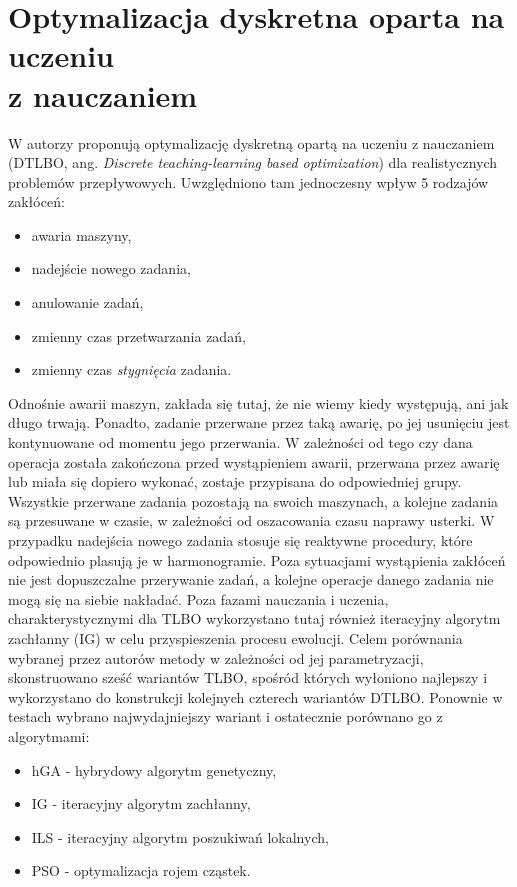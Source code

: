 \documentclass[printmode,oneside]{mgr}
\begin{document}
\section[Optymalizacja dyskretna oparta na uczeniu z nauczaniem]{Optymalizacja dyskretna oparta na uczeniu\\ z nauczaniem}
W \cite{DTLBO} autorzy proponują optymalizację dyskretną opartą na uczeniu z nauczaniem (\mbox{DTLBO}, ang. \emph{Discrete teaching-learning based optimization}) dla realistycznych problemów przepływowych. Uwzględniono tam jednoczesny wpływ 5 rodzajów zakłóceń:
\begin{itemize}
    \item awaria maszyny,
    \item nadejście nowego zadania,
    \item anulowanie zadań,
    \item zmienny czas przetwarzania zadań,
    \item zmienny czas \emph{stygnięcia} zadania.
\end{itemize}
Odnośnie awarii maszyn, zakłada się tutaj, że nie wiemy kiedy występują, ani jak długo trwają. Ponadto, zadanie przerwane przez taką awarię, po jej usunięciu jest kontynuowane od momentu jego przerwania. W zależności od tego czy dana operacja została zakończona przed wystąpieniem awarii, przerwana przez awarię lub miała się dopiero wykonać, zostaje przypisana do odpowiedniej grupy. Wszystkie przerwane zadania pozostają na swoich maszynach, a  kolejne zadania są przesuwane w czasie, w zależności od oszacowania czasu naprawy usterki. W przypadku nadejścia nowego zadania stosuje się reaktywne procedury, które odpowiednio plasują je w harmonogramie. Poza sytuacjami wystąpienia zakłóceń nie jest dopuszczalne przerywanie zadań, a kolejne operacje danego zadania nie mogą się na siebie nakładać. Poza fazami nauczania i uczenia, charakterystycznymi dla TLBO wykorzystano tutaj również iteracyjny algorytm zachłanny (IG) w celu przyspieszenia procesu ewolucji. Celem porównania wybranej przez autorów metody w zależności od jej parametryzacji, skonstruowano sześć wariantów TLBO, spośród których wyłoniono najlepszy i wykorzystano do konstrukcji kolejnych czterech wariantów DTLBO. Ponownie w testach wybrano najwydajniejszy wariant i ostatecznie porównano go z algorytmami:
\begin{itemize}
    \item hGA - hybrydowy algorytm genetyczny,
    \item IG - iteracyjny algorytm zachłanny,
    \item ILS - iteracyjny algorytm poszukiwań lokalnych,
    \item PSO - optymalizacja rojem cząstek.
\end{itemize}
\end{document}

